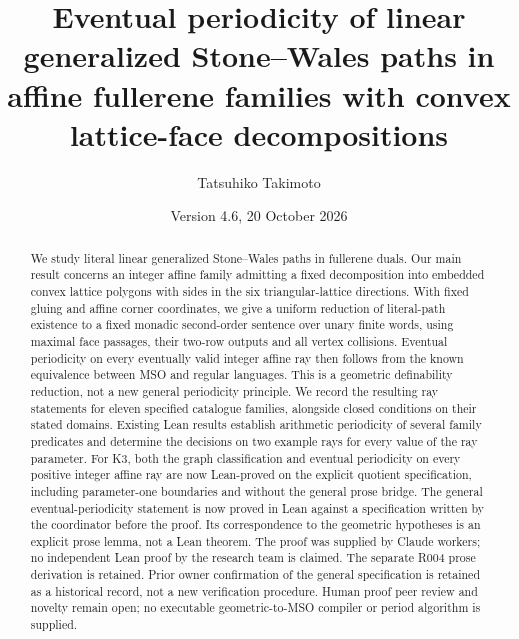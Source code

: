 \documentclass[11pt]{amsart}
\title[Affine fullerene families and eventual periodicity]{Eventual periodicity of linear generalized Stone--Wales paths in affine fullerene families with convex lattice-face decompositions}
\author{Tatsuhiko Takimoto}
\date{Version 4.6, 20 October 2026}
\theoremstyle{definition}\newtheorem{definition}{Definition}
\begin{document}
\begin{abstract}
We study literal linear generalized Stone--Wales paths in fullerene
duals. Our main result concerns an integer affine family admitting a
fixed decomposition into embedded convex lattice polygons with sides
in the six triangular-lattice directions. With fixed gluing and affine
corner coordinates, we give a uniform reduction of literal-path
existence to a fixed monadic second-order sentence over unary finite
words, using maximal face passages, their two-row outputs and all
vertex collisions. Eventual periodicity on every eventually valid
integer affine ray then follows from the known equivalence between
MSO and regular languages. This is a geometric definability reduction,
not a new general periodicity principle. We record
the resulting ray statements for eleven specified catalogue families,
alongside closed conditions on their stated domains. Existing Lean
results establish arithmetic periodicity of several family predicates
and determine the decisions on two example rays for every value of the ray parameter. For K3, both the graph classification and eventual periodicity on every
positive integer affine ray are now Lean-proved on the explicit quotient
specification, including parameter-one boundaries and without the general
prose bridge. The general eventual-periodicity statement is now proved
in Lean against a specification written by the coordinator before the
proof. Its correspondence to the geometric hypotheses is an explicit
prose lemma, not a Lean theorem. The proof was supplied by Claude
workers; no independent Lean proof by the research team is claimed.
The separate R004 prose derivation is retained. Prior owner confirmation of the general specification is retained as a
historical record, not a new verification procedure. Human proof peer review
and novelty remain open;
no executable geometric-to-MSO compiler or period algorithm is supplied.
\end{abstract}
\maketitle
\end{document}
